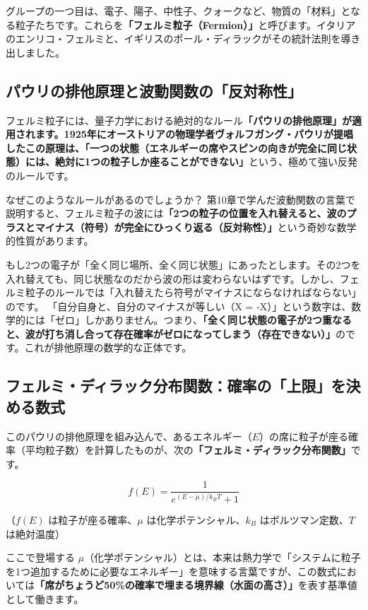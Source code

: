 グループの一つ目は、電子、陽子、中性子、クォークなど、物質の「材料」となる粒子たちです。これらを\textbf{「フェルミ粒子（Fermion）」}と呼びます。イタリアのエンリコ・フェルミと、イギリスのポール・ディラックがその統計法則を導き出しました。

\subsection{パウリの排他原理と波動関数の「反対称性」}

フェルミ粒子には、量子力学における絶対的なルール\textbf{「パウリの排他原理」が適用されます。1925年にオーストリアの物理学者ヴォルフガング・パウリが提唱したこの原理は、「一つの状態（エネルギーの席やスピンの向きが完全に同じ状態）には、絶対に1つの粒子しか座ることができない」}という、極めて強い反発のルールです。

なぜこのようなルールがあるのでしょうか？ 第10章で学んだ波動関数の言葉で説明すると、フェルミ粒子の波には\textbf{「2つの粒子の位置を入れ替えると、波のプラスとマイナス（符号）が完全にひっくり返る（反対称性）」}という奇妙な数学的性質があります。

もし2つの電子が「全く同じ場所、全く同じ状態」にあったとします。その2つを入れ替えても、同じ状態なのだから波の形は変わらないはずです。しかし、フェルミ粒子のルールでは「入れ替えたら符号がマイナスにならなければならない」のです。 「自分自身と、自分のマイナスが等しい（X = -X）」という数字は、数学的には「ゼロ」しかありません。つまり、\textbf{「全く同じ状態の電子が2つ重なると、波が打ち消し合って存在確率がゼロになってしまう（存在できない）」}のです。これが排他原理の数学的な正体です。

\subsection{フェルミ・ディラック分布関数：確率の「上限」を決める数式}

このパウリの排他原理を組み込んで、あるエネルギー（\(E\)）の席に粒子が座る確率（平均粒子数）を計算したものが、次の\textbf{「フェルミ・ディラック分布関数」}です。

\[
f(E) = \frac{1}{e^{(E-\mu)/k_B T}+1}
\]

（\(f(E)\) は粒子が座る確率、\(\mu\) は化学ポテンシャル、\(k_B\) はボルツマン定数、\(T\) は絶対温度）

ここで登場する \(\mu\)（化学ポテンシャル）とは、本来は熱力学で「システムに粒子を1つ追加するために必要なエネルギー」を意味する言葉ですが、この数式においては\textbf{「席がちょうど50\%の確率で埋まる境界線（水面の高さ）」}を表す基準値として働きます。

